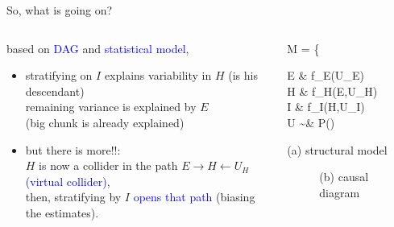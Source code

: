 %
%
\begin{frame}
	{So, what is going on?}
	\begin{columns}
		\begin{column}{0.5\textwidth}
			based on \textcolor{blue}{DAG} and \textcolor{blue}{statistical model},
			\begin{itemize}
				\item stratifying on $I$ explains variability in $H$ (is his descendant) \\
				remaining variance is explained by $E$ \\
				{\small (big chunk is already explained)}
				\item but there is more!!: \\
				$H$ is now a collider in the path $E \rightarrow H \leftarrow U_{H}$ \textcolor{blue}{(virtual collider)}, \\
				then, stratifying by $I$ \textcolor{blue}{opens that path} (biasing the estimates).
			\end{itemize}
		\end{column}
		\begin{column}{0.5\textwidth}  
			\begin{equ}
				M = \left\{ \begin{aligned} 
					E \leftarrow & \; f_{E}(U_{E}) \\
					H \leftarrow & \; f_{H}(E,U_{H}) \\
					I \leftarrow & \; f_{I}(H,U_{I}) \\
					U \sim & \; P()
				\end{aligned} \right
				\caption*{(a) structural model}
			\end{equ}
			\begin{figure}
				\caption*{(b) causal diagram}
			\end{figure}
		\end{column}
	\end{columns}
\end{frame}
